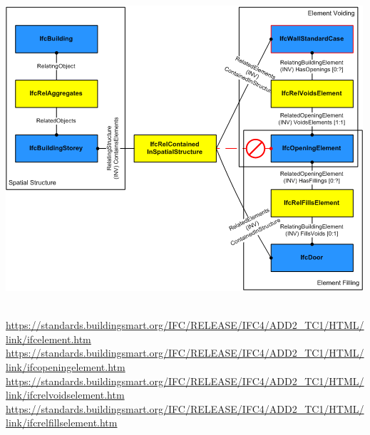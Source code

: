 \documentclass[spanish,10pt,a4paper,final,oneside]{article}
\begin{document}
\begin{itemize}
\includegraphics[width=\textwidth]{ifcrelfillselements-fig1}
\begin{footnotesize}
\\ \url{https://standards.buildingsmart.org/IFC/RELEASE/IFC4/ADD2_TC1/HTML/link/ifcelement.htm}
\\ \url{https://standards.buildingsmart.org/IFC/RELEASE/IFC4/ADD2_TC1/HTML/link/ifcopeningelement.htm}
\\ \url{https://standards.buildingsmart.org/IFC/RELEASE/IFC4/ADD2_TC1/HTML/link/ifcrelvoidselement.htm}
\\ \url{https://standards.buildingsmart.org/IFC/RELEASE/IFC4/ADD2_TC1/HTML/link/ifcrelfillselement.htm}
\end{footnotesize}


\end{itemize}
\end{document}
